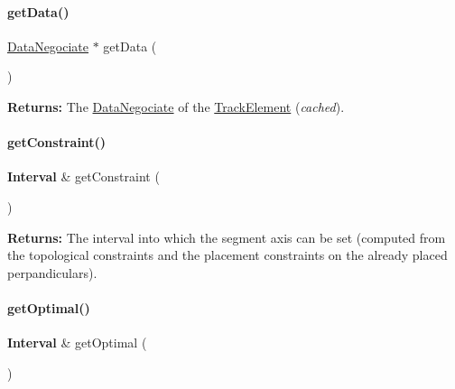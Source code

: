 \paragraph{\texorpdfstring{get\+Data()}{getData()}}
{\footnotesize\ttfamily \mbox{\hyperlink{classKite_1_1DataNegociate}{Data\+Negociate}} $\ast$ get\+Data (\begin{DoxyParamCaption}{ }\end{DoxyParamCaption})\hspace{0.3cm}{\ttfamily [inline]}}

{\bfseries Returns\+:} The \mbox{\hyperlink{classKite_1_1DataNegociate}{Data\+Negociate}} of the \mbox{\hyperlink{classKite_1_1TrackElement}{Track\+Element}} ({\itshape cached}). \mbox{\label{classKite_1_1SegmentFsm_abf6603c742bee65a4effa24135f2d955}} 
\paragraph{\texorpdfstring{get\+Constraint()}{getConstraint()}}
{\footnotesize\ttfamily \textbf{ Interval} \& get\+Constraint (\begin{DoxyParamCaption}{ }\end{DoxyParamCaption})\hspace{0.3cm}{\ttfamily [inline]}}

{\bfseries Returns\+:} The interval into which the segment axis can be set (computed from the topological constraints and the placement constraints on the already placed perpandiculars). \mbox{\label{classKite_1_1SegmentFsm_a9d1a7f4108b49d3096d8c733fabe60f3}} 
\paragraph{\texorpdfstring{get\+Optimal()}{getOptimal()}}
{\footnotesize\ttfamily \textbf{ Interval} \& get\+Optimal (\begin{DoxyParamCaption}{ }\end{DoxyParamCaption})\hspace{0.3cm}{\ttfamily [inline]}}

